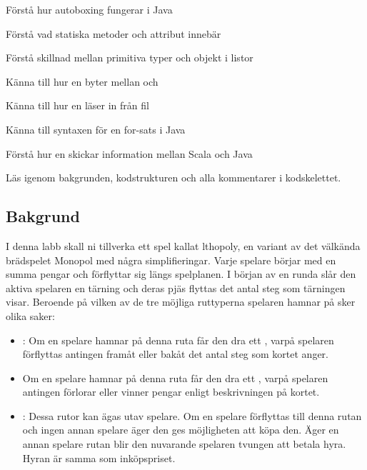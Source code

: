 

\Teamlab{\LabWeekTWELVE}

\begin{Goals}
\item Förstå hur autoboxing fungerar i Java
\item Förstå vad statiska metoder och attribut innebär
\item Förstå skillnad mellan primitiva typer och objekt i listor
\item Känna till hur en byter mellan  och 
\item Känna till hur en läser in från fil
\item Känna till syntaxen för en for-sats i Java
\item Förstå hur en skickar information mellan Scala och Java
\end{Goals}

\begin{Preparations}
\item {}
\item Läs igenom bakgrunden, kodstrukturen och alla kommentarer i kodskelettet.

\end{Preparations}

\subsection{Bakgrund}
I denna labb skall ni tillverka ett spel kallat lthopoly, en variant av det välkända brädspelet Monopol med några simplifieringar. Varje spelare börjar med en summa pengar och förflyttar sig längs spelplanen.
I början av en runda slår den aktiva spelaren en tärning och deras pjäs flyttas det antal steg som tärningen visar. 
Beroende på vilken av de tre möjliga ruttyperna spelaren hamnar på sker olika saker:

\begin{itemize}
\item {}: Om en spelare hamnar på denna ruta får den dra ett , varpå spelaren förflyttas antingen framåt eller bakåt det antal steg som kortet anger.
\item {} Om en spelare hamnar på denna ruta får den dra ett , varpå spelaren antingen förlorar eller vinner pengar enligt beskrivningen på kortet.
\item {}: Dessa rutor kan ägas utav spelare. Om en spelare förflyttas till denna rutan och ingen annan spelare äger den ges möjligheten att köpa den. Äger en annan spelare rutan blir den nuvarande spelaren tvungen att betala hyra. Hyran är samma som inköpspriset.
\end{itemize}

